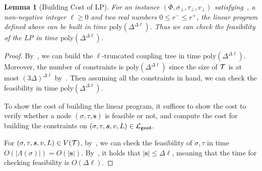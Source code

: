 \documentclass[11pt]{article}
\newtheorem{lemma}[theorem]{Lemma}
\newcommand{\abs}[1]{\left\vert#1\right\vert}
\def\!#1{\mathtt{#1}}
\def\poly{\mathrm{poly}}
\newcommand{\seqS}{\boldsymbol{s}}
\newcommand{\qgl}[1]{{\color{purple}{#1}}}
\begin{document}
\qgl{rewrite this, replace the notations.}
\begin{lemma}[Building Cost of LP] \label{lem:building-cost-of-LP}
    For an instance $(\Phi, \sigma_\bot, \tau_\bot, v_\bot)$ satisfying~, a non-negative integer $\ell \ge 0$ and two real numbers $0 \le r^- \le r^+$,
    the linear program defined above can be built in time $\poly\left(\Delta^{\Delta \ell}\right)$. Thus we can check the feasibility of the LP in time $\poly\left(\Delta^{\Delta \ell}\right)$.
\end{lemma}
\begin{proof}
    By~, we can build the $\ell$-truncated coupling tree in time $\poly\left(\Delta^{\Delta \ell}\right)$. Moreover, the number of constraints is $\poly\left(\Delta^{\Delta \ell}\right)$ since the size of $\mathcal{T}$ is at most $(3\Delta)^{\Delta \ell}$ by~. Then assuming all the constraints in hand, we can check the feasibility in time $\poly\left(\Delta^{\Delta \ell}\right)$.
    
    To show the cost of building the linear program, it suffices to show the cost to verify whether a node $(\sigma, \tau, \seqS)$ is feasible or not, and compute the cost for building the constraints on $(\sigma, \tau, \seqS, v, L) \in \+L_{\!{good}}$.

    For $(\sigma, \tau, \seqS, v, L) \in V(\+T)$, by~, we can check the feasibility of $\sigma, \tau$ in time $O(\abs{\Lambda(\sigma)}) = O(\abs{\seqS})$. By~, it holds that $\abs{\seqS} \le \Delta \ell$, meaning that the time for checking feasibility is $O(\Delta \ell)$.
    

\end{proof}
\end{document}
